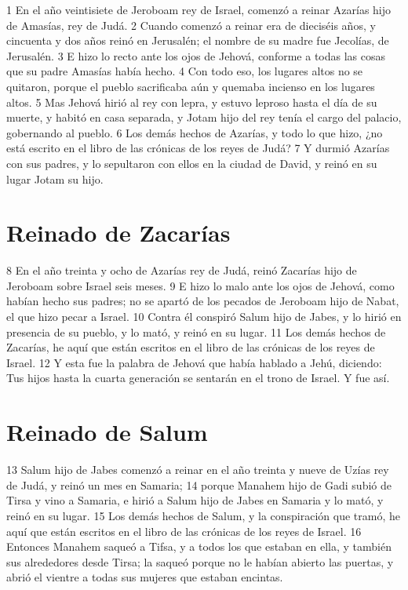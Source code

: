 1 En el año veintisiete de Jeroboam rey de Israel, comenzó a reinar Azarías hijo de Amasías, rey de Judá.
2 Cuando comenzó a reinar era de dieciséis años, y cincuenta y dos años reinó en Jerusalén; el nombre de su madre fue Jecolías, de Jerusalén.
3 E hizo lo recto ante los ojos de Jehová, conforme a todas las cosas que su padre Amasías había hecho.
4 Con todo eso, los lugares altos no se quitaron, porque el pueblo sacrificaba aún y quemaba incienso en los lugares altos.
5 Mas Jehová hirió al rey con lepra, y estuvo leproso hasta el día de su muerte, y habitó en casa separada, y Jotam hijo del rey tenía el cargo del palacio, gobernando al pueblo.
6 Los demás hechos de Azarías, y todo lo que hizo, ¿no está escrito en el libro de las crónicas de los reyes de Judá?
7 Y durmió Azarías con sus padres, y lo sepultaron con ellos en la ciudad de David, y reinó en su lugar Jotam su hijo.

\section*{Reinado de Zacarías}

8 En el año treinta y ocho de Azarías rey de Judá, reinó Zacarías hijo de Jeroboam sobre Israel seis meses.
9 E hizo lo malo ante los ojos de Jehová, como habían hecho sus padres; no se apartó de los pecados de Jeroboam hijo de Nabat, el que hizo pecar a Israel.
10 Contra él conspiró Salum hijo de Jabes, y lo hirió en presencia de su pueblo, y lo mató, y reinó en su lugar.
11 Los demás hechos de Zacarías, he aquí que están escritos en el libro de las crónicas de los reyes de Israel.
12 Y esta fue la palabra de Jehová que había hablado a Jehú, diciendo: Tus hijos hasta la cuarta generación se sentarán en el trono de Israel. Y fue así.

\section*{Reinado de Salum}

13 Salum hijo de Jabes comenzó a reinar en el año treinta y nueve de Uzías rey de Judá, y reinó un mes en Samaria;
14 porque Manahem hijo de Gadi subió de Tirsa y vino a Samaria, e hirió a Salum hijo de Jabes en Samaria y lo mató, y reinó en su lugar.
15 Los demás hechos de Salum, y la conspiración que tramó, he aquí que están escritos en el libro de las crónicas de los reyes de Israel.
16 Entonces Manahem saqueó a Tifsa, y a todos los que estaban en ella, y también sus alrededores desde Tirsa; la saqueó porque no le habían abierto las puertas, y abrió el vientre a todas sus mujeres que estaban encintas.

